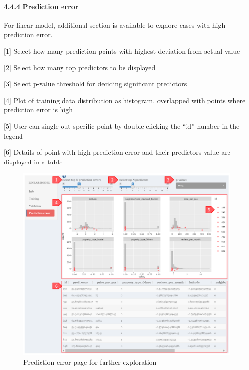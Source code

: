 \documentclass[
  12pt,
]{article}
\begin{document}
\hypertarget{prediction-error}{%
\paragraph{4.4.4 Prediction error}\label{prediction-error}}

For linear model, additional section is available to explore cases with
high prediction error.

{[}1{]} Select how many prediction points with highest deviation from
actual value

{[}2{]} Select how many top predictors to be displayed

{[}3{]} Select p-value threshold for deciding significant predictors

{[}4{]} Plot of training data distribution as histogram, overlapped with
points where prediction error is high

{[}5{]} User can single out specific point by double clicking the ``id''
number in the legend

{[}6{]} Details of point with high prediction error and their predictors
value are displayed in a table

\begin{figure}[H]

{\centering \includegraphics[width=0.95\linewidth]{images/mdltrain8} 

}

\caption{Prediction error page for further exploration}\label{fig:unnamed-chunk-33}
\end{figure}
\end{document}
